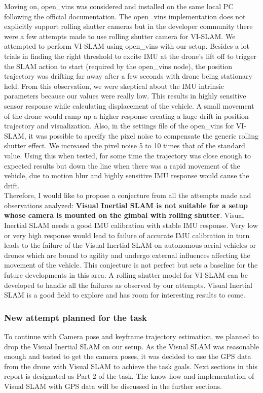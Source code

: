 Moving on, open\_vins was considered and installed on the same local PC following the official documentation. The open\_vins implementation does not explicitly support rolling shutter cameras but in the developer community there were a few attempts made to use rolling shutter camera for VI-SLAM. We attempted to perform VI-SLAM using open\_vins with our setup. Besides a lot trials in finding the right threshold to excite IMU at the drone's lift off to trigger the SLAM action to start (required by the open\_vins node), the position trajectory was drifting far away after a few seconds with drone being stationary held. From this observation, we were skeptical about the IMU intrinsic parameters because our values were really low. This results in highly sensitive sensor response while calculating displacement of the vehicle. A small movement of the drone would ramp up a higher response creating a huge drift in position trajectory and visualization. Also, in the settings file of the open\_vins for VI-SLAM, it was possible to specify the pixel noise to compensate the generic rolling shutter effect. We increased the pixel noise 5 to 10 times that of the standard value. Using this when tested, for some time the trajectory was close enough to expected results but down the line when there was a rapid movement of the vehicle, due to motion blur and highly sensitive IMU response would cause the drift. \\

Therefore, I would like to propose a conjecture from all the attempts made and observations analyzed: \textbf{Visual Inertial SLAM is not suitable for a setup whose camera is mounted on the gimbal with rolling shutter}. Visual Inertial SLAM needs a good IMU calibration with stable IMU response. Very low or very high response would lead to failure of accurate IMU calibration in turn leads to the failure of the Visual Inertial SLAM on autonomous aerial vehicles or drones which are bound to agility and undergo external influences affecting the movement of the vehicle. This conjecture is not perfect but sets a baseline for the future developments in this area. A rolling shutter model for VI-SLAM can be developed to handle all the failures as observed by our attempts. Visual Inertial SLAM is a good field to explore and has room for interesting results to come.

\subsubsection*{New attempt planned for the task}
To continue with Camera pose and keyframe trajectory estimation, we planned to drop the Visual Inertial SLAM on our setup. As the Visual SLAM was reasonable enough and tested to get the camera poses, it was decided to use the GPS data from the drone with Visual SLAM to achieve the task goals. Next sections in this report is designated as Part 2 of the task. The know-how and implementation of Visual SLAM with GPS data will be discussed in the further sections.

